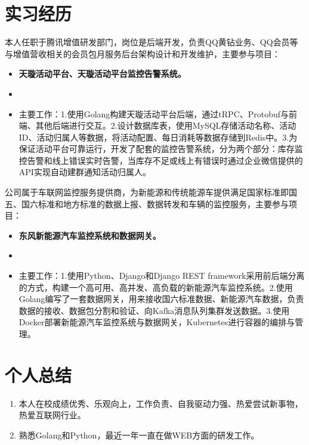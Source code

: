 \documentclass{resume}
\begin{document}

\section{实习经历}
\begin{onehalfspacing}
本人任职于腾讯增值研发部门，岗位是后端开发，负责QQ黄钻业务、QQ会员等与增值营收相关的会员包月服务后台架构设计和开发维护，主要参与项目：
\begin{itemize}
  \item \textbf{天璇活动平台、天璇活动平台监控告警系统。}
  \item {}
  \item 主要工作：1.使用Golang构建天璇活动平台后端，通过tRPC、Protobuf与前端、其他后端进行交互。2.设计数据库表，使用MySQL存储活动名称、活动ID、活动归属人等数据，将活动配置、每日消耗等数据存储到Redis中。3.为保证活动平台可靠运行，开发了配套的监控告警系统，分为两个部分：库存监控告警和线上错误实时告警，当库存不足或线上有错误时通过企业微信提供的API实现自动建群通知活动归属人。
\end{itemize}
\end{onehalfspacing}

\begin{onehalfspacing}
公司属于车联网监控服务提供商，为新能源和传统能源车提供满足国家标准即国五、国六标准和地方标准的数据上报、数据转发和车辆的监控服务，主要参与项目：
\begin{itemize}
  \item \textbf{东风新能源汽车监控系统和数据网关。}
  \item {}
  \item 主要工作：1.使用Python、Django和Django REST framework采用前后端分离的方式，构建一个高可用、高并发、高负载的新能源汽车监控系统。2.使用Golang编写了一套数据网关，用来接收国六标准数据、新能源汽车数据，负责数据的接收、数据包分割和验证、向Kafka消息队列集群发送数据。3.使用Docker部署新能源汽车监控系统与数据网关，Kubernetes进行容器的编排与管理。
\end{itemize}
\end{onehalfspacing}

\section{个人总结}
\begin{enumerate}
  \item 本人在校成绩优秀、乐观向上，工作负责、自我驱动力强、热爱尝试新事物，热爱互联网行业。
  \item 熟悉Golang和Python，最近一年一直在做WEB方面的研发工作。
\end{enumerate}


%
%
\end{document}
